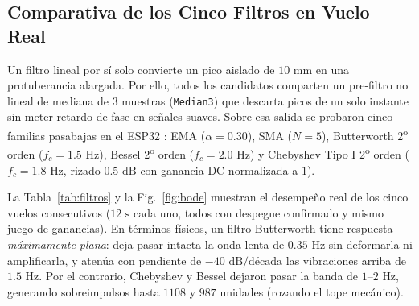 \documentclass[conference]{IEEEtran}
\begin{document}
\subsection{Comparativa de los Cinco Filtros en Vuelo Real}
Un filtro lineal por s\'{i} solo convierte un pico aislado de $10\text{ mm}$ en una protuberancia alargada. Por ello, todos los candidatos comparten un pre-filtro no lineal de mediana de 3 muestras (\texttt{Median3}) que descarta picos de un solo instante sin meter retardo de fase en se\~{n}ales suaves. Sobre esa salida se probaron cinco familias pasabajas en el ESP32 \cite{vignolo_filtros,cayetano_dsp}: EMA ($\alpha = 0.30$), SMA ($N = 5$), Butterworth 2\textsuperscript{o} orden ($f_c = 1.5\text{ Hz}$), Bessel 2\textsuperscript{o} orden ($f_c = 2.0\text{ Hz}$) y Chebyshev Tipo I 2\textsuperscript{o} orden ($f_c = 1.8\text{ Hz}$, rizado $0.5\text{ dB}$ con ganancia DC normalizada a $1$).

La Tabla~\ref{tab:filtros} y la Fig.~\ref{fig:bode} muestran el desempe\~{n}o real de los cinco vuelos consecutivos ($12\text{ s}$ cada uno, todos con despegue confirmado y mismo juego de ganancias). En t\'{e}rminos f\'{i}sicos, un filtro Butterworth tiene respuesta \textit{m\'{a}ximamente plana}: deja pasar intacta la onda lenta de $0.35\text{ Hz}$ sin deformarla ni amplificarla, y aten\'{u}a con pendiente de $-40\text{ dB/d\'{e}cada}$ las vibraciones arriba de $1.5\text{ Hz}$. Por el contrario, Chebyshev y Bessel dejaron pasar la banda de $1\text{--}2\text{ Hz}$, generando sobreimpulsos hasta $1108$ y $987$ unidades (rozando el tope mec\'{a}nico).

\begin{table}[t]
  \centering
  \caption{Resultados Experimentales de los Cinco Filtros Pasabajas en Vuelo Senoidal Real (\texttt{COM4}, $12\text{ s}$ c/u, sin Reinicio)}
  \label{tab:filtros}
\end{table}
\end{document}

